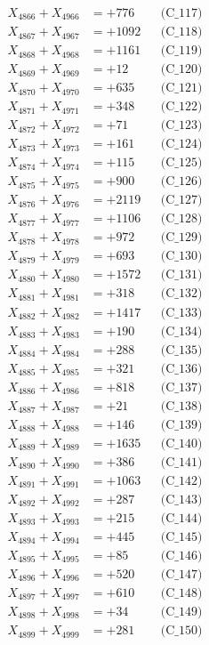 \documentclass[a4paper,10pt]{article}
\begin{document}
{\begin{align}
X_{4866} + X_{4966} &= +776 && \text{(C\_117)} \\
X_{4867} + X_{4967} &= +1092 && \text{(C\_118)} \\
X_{4868} + X_{4968} &= +1161 && \text{(C\_119)} \\
X_{4869} + X_{4969} &= +12 && \text{(C\_120)} \\
\allowbreak
X_{4870} + X_{4970} &= +635 && \text{(C\_121)} \\
X_{4871} + X_{4971} &= +348 && \text{(C\_122)} \\
X_{4872} + X_{4972} &= +71 && \text{(C\_123)} \\
X_{4873} + X_{4973} &= +161 && \text{(C\_124)} \\
X_{4874} + X_{4974} &= +115 && \text{(C\_125)} \\
\allowbreak
X_{4875} + X_{4975} &= +900 && \text{(C\_126)} \\
X_{4876} + X_{4976} &= +2119 && \text{(C\_127)} \\
X_{4877} + X_{4977} &= +1106 && \text{(C\_128)} \\
X_{4878} + X_{4978} &= +972 && \text{(C\_129)} \\
X_{4879} + X_{4979} &= +693 && \text{(C\_130)} \\
\allowbreak
X_{4880} + X_{4980} &= +1572 && \text{(C\_131)} \\
X_{4881} + X_{4981} &= +318 && \text{(C\_132)} \\
X_{4882} + X_{4982} &= +1417 && \text{(C\_133)} \\
X_{4883} + X_{4983} &= +190 && \text{(C\_134)} \\
X_{4884} + X_{4984} &= +288 && \text{(C\_135)} \\
\allowbreak
X_{4885} + X_{4985} &= +321 && \text{(C\_136)} \\
X_{4886} + X_{4986} &= +818 && \text{(C\_137)} \\
X_{4887} + X_{4987} &= +21 && \text{(C\_138)} \\
X_{4888} + X_{4988} &= +146 && \text{(C\_139)} \\
X_{4889} + X_{4989} &= +1635 && \text{(C\_140)} \\
\allowbreak
X_{4890} + X_{4990} &= +386 && \text{(C\_141)} \\
X_{4891} + X_{4991} &= +1063 && \text{(C\_142)} \\
X_{4892} + X_{4992} &= +287 && \text{(C\_143)} \\
X_{4893} + X_{4993} &= +215 && \text{(C\_144)} \\
X_{4894} + X_{4994} &= +445 && \text{(C\_145)} \\
\allowbreak
X_{4895} + X_{4995} &= +85 && \text{(C\_146)} \\
X_{4896} + X_{4996} &= +520 && \text{(C\_147)} \\
X_{4897} + X_{4997} &= +610 && \text{(C\_148)} \\
X_{4898} + X_{4998} &= +34 && \text{(C\_149)} \\
X_{4899} + X_{4999} &= +281 && \text{(C\_150)} \\
\end{align}
}
\end{document}
